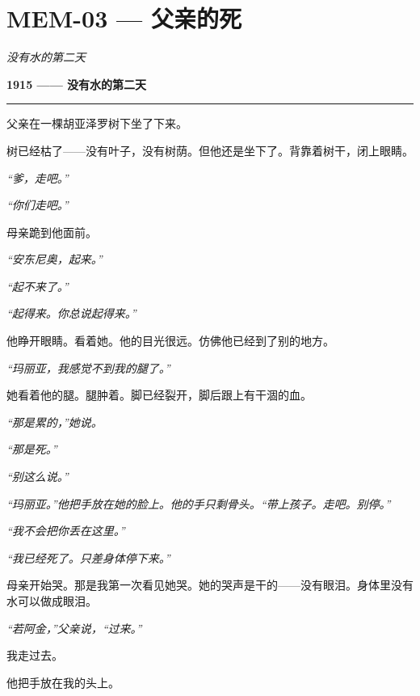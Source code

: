 \section*{\textbf{MEM-03} --- 父亲的死}

\noindent \textit{没有水的第二天}

\noindent \textbf{1915 —— 没有水的第二天}

\vspace{0.5em}\noindent\rule{\textwidth}{0.5pt}\vspace{0.5em}

\noindent 父亲在一棵胡亚泽罗树下坐了下来。

\noindent 树已经枯了——没有叶子，没有树荫。但他还是坐下了。背靠着树干，闭上眼睛。

\noindent \textit{“爹，走吧。”}

\noindent \textit{“你们走吧。”}

\noindent 母亲跪到他面前。

\noindent \textit{“安东尼奥，起来。”}

\noindent \textit{“起不来了。”}

\noindent \textit{“起得来。你总说起得来。”}

\noindent 他睁开眼睛。看着她。他的目光很远。仿佛他已经到了别的地方。

\noindent \textit{“玛丽亚，我感觉不到我的腿了。”}

\noindent 她看着他的腿。腿肿着。脚已经裂开，脚后跟上有干涸的血。

\noindent \textit{“那是累的，”她说。}

\noindent \textit{“那是死。”}

\noindent \textit{“别这么说。”}

\noindent \textit{“玛丽亚。”他把手放在她的脸上。他的手只剩骨头。“带上孩子。走吧。别停。”}

\noindent \textit{“我不会把你丢在这里。”}

\noindent \textit{“我已经死了。只差身体停下来。”}

\noindent 母亲开始哭。那是我第一次看见她哭。她的哭声是干的——没有眼泪。身体里没有水可以做成眼泪。

\noindent \textit{“若阿金，”父亲说，“过来。”}

\noindent 我走过去。

\noindent 他把手放在我的头上。

